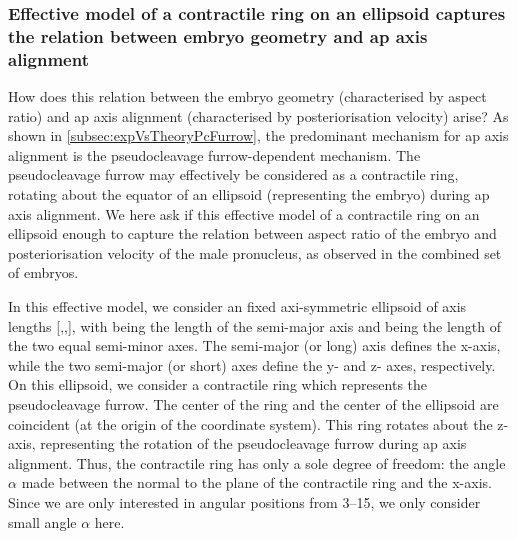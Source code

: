 \subsubsection{Effective model of a contractile ring on an ellipsoid captures the relation between embryo geometry and \acs{ap} axis alignment}\label{subsubsec:effectiveModel}

How does this relation between the embryo geometry (characterised by aspect ratio) and \ac{ap} axis alignment (characterised by posteriorisation velocity) arise? As shown in \autoref{subsec:expVsTheoryPcFurrow}, the predominant mechanism for \ac{ap} axis alignment is the pseudocleavage furrow-dependent mechanism. The pseudocleavage furrow may effectively be considered as a contractile ring, rotating about the equator of an ellipsoid (representing the embryo) during \ac{ap} axis alignment. We here ask if this effective model of a contractile ring on an ellipsoid enough to capture the relation between aspect ratio of the embryo and posteriorisation velocity of the male pronucleus, as observed in the combined set of embryos.

In this effective model, we consider an fixed axi-symmetric ellipsoid of axis lengths [\longAxisLength,\shortAxisLength,\shortAxisLength], with \longAxisLength being the length of the semi-major axis and \shortAxisLength being the length of the two equal semi-minor axes. The semi-major (or long) axis defines the x-axis, while the two semi-major (or short) axes define the y- and z- axes, respectively. On this ellipsoid, we consider a contractile ring which represents the pseudocleavage furrow. The center of the ring and the center of the ellipsoid are coincident (at the origin of the coordinate system). This ring rotates about the z-axis, representing the rotation of the pseudocleavage furrow during \ac{ap} axis alignment. Thus, the contractile ring has only a sole degree of freedom: the angle $\alpha$ made between the normal to the plane of the contractile ring and the x-axis. Since we are only interested in angular positions from \SIrange{3}{15}{\unitAngle}, we only consider small angle $\alpha$ here.


